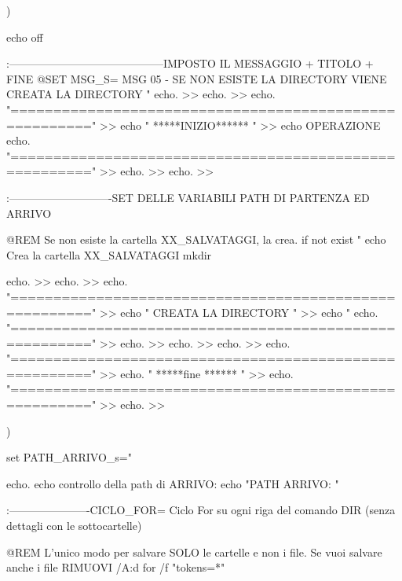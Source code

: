 \documentclass[10pt,a4paper]{book}
\begin{document}
{			)
			
			
			
			
			echo off
			
			:------------------------------------------IMPOSTO IL MESSAGGIO + TITOLO + FINE
			@SET MSG_S= MSG 05 - SE NON ESISTE LA DIRECTORY  VIENE CREATA LA DIRECTORY "%
			echo.										>> %
			echo.										>> %
			echo. "======================================================="			>> %
			echo  " 		*****INIZIO****** 		      "			>> %
			echo   OPERAZIONE %
			echo. "======================================================="			>> %
			echo.										>> %
			echo.										>> %
			
			:----------------------------SET DELLE VARIABILI PATH DI PARTENZA ED ARRIVO
			
			@REM Se non esiste la cartella XX_SALVATAGGI, la crea.
			if not exist "%
			echo Crea la cartella XX_SALVATAGGI
			mkdir %
			
			echo.										>> %
			echo.										>> %
			echo. "======================================================="			>> %
			echo  " CREATA LA DIRECTORY 				      "			>> %
			echo   "%
			echo. "======================================================="			>> %
			echo.										>> %
			echo.										>> %
			echo.										>> %
			echo. "======================================================="			>> %
			echo. "                  *****fine ******                     "			>> %
			echo. "======================================================="			>> %
			echo.										>> %
			
			)
			
			set PATH_ARRIVO_s="%
			
			echo. 
			echo controllo della path di ARRIVO:
			echo "PATH ARRIVO: " %
			
			
			:----------------------CICLO_FOR= Ciclo For su ogni riga del comando DIR (senza dettagli con le sottocartelle)
			
			
			@REM L'unico modo per salvare SOLO le cartelle e non i file. Se vuoi salvare anche i file RIMUOVI /A:d
			for /f "tokens=*" %
			
}
\end{document}
